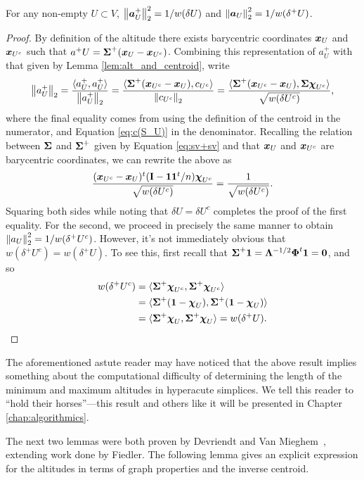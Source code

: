 \begin{lemma}
\label{lem:||alt||}
For any non-empty $U\subset V$, $\norm{\vb*{a}^+_U}_2^2=1/w(\delta U)$ and $\norm{\vb*{a}_U}_2^2 = 1/w(\delta^+ U)$.  
\end{lemma}
\begin{proof}
By definition of the altitude there exists barycentric coordinates $\vb*{x}_U$ and $\vb*{x}_{U^c}$ such that $a^+U = \boldsymbol{\Sigma}^+(\vb*{x}_U-\vb*{x}_{U^c})$. Combining this representation of $a^+_U$ with that given by Lemma \ref{lem:alt_and_centroid}, write 
\begin{align*}
    \norm{a^+_U}_2 = \frac{\langle a^+_U,a^+_U\rangle }{\norm{a^+_U}_2} = \frac{\langle \boldsymbol{\Sigma}^+(\vb*{x}_{U^c}-\vb*{x}_{U}), c_{U^c}\rangle }{\norm{c_{U^c}}_2} = \frac{\langle \boldsymbol{\Sigma}^+(\vb*{x}_{U^c}-\vb*{x}_{U}), \boldsymbol{\Sigma}\boldsymbol{\chi}_{U^c}\rangle }{\sqrt{w(\delta U^c)}},
\end{align*}
where the final equality comes from using the definition of the centroid in the numerator, and Equation \ref{eq:c(S_U)} in the denominator. Recalling the relation between $\boldsymbol{\Sigma}$ and $\boldsymbol{\Sigma}^+$ given by Equation \ref{eq:sv+sv} and that $\vb*{x}_U$ and $\vb*{x}_{U^c}$ are barycentric coordinates, we can rewrite the above as 
\[\frac{(\vb*{x}_{U^c}-\vb*{x}_{U})^t(\vb{I}-\vb{1}\vb{1}^t/n)\boldsymbol{\chi}_{U^c}}{\sqrt{w(\delta U^c)}}=\frac{1}{\sqrt{w(\delta U^c)}}. \]
Squaring both sides while noting that $\delta U = \delta U^c$ completes the proof of the first equality. For the second, we proceed in precisely the same manner to obtain $\norm{a_U}_2^2 = 1/w(\delta^+ U^c)$. However, it's not immediately obvious that $w(\delta^+U^c)=w(\delta^+U)$. To see this, first recall that $\boldsymbol{\Sigma}^+\vb{1} = \vb{\Lambda}^{-1/2}\boldsymbol{\Phi}^t\vb{1} = \vb{0}$, and so 
\begin{align*}
w(\delta^+ U^c) &= \langle \boldsymbol{\Sigma}^+\boldsymbol{\chi}_{U^c},\boldsymbol{\Sigma}^+\boldsymbol{\chi}_{U^c}\rangle  \\
&= \langle \boldsymbol{\Sigma}^+(\vb{1} - \boldsymbol{\chi}_{U}),\boldsymbol{\Sigma}^+(\vb{1} - \boldsymbol{\chi}_{U})\rangle  \\
&= \langle \boldsymbol{\Sigma}^+\boldsymbol{\chi}_{U},\boldsymbol{\Sigma}^+\boldsymbol{\chi}_{U}\rangle = w(\delta^+ U).
\qedhere
\end{align*}
\end{proof}

The aforementioned astute reader may have noticed that the above result implies something about the computational difficulty of determining the length of the minimum and maximum altitudes in hyperacute simplices. We tell this reader to ``hold their horses''---this result and others like it will be presented in Chapter \ref{chap:algorithmics}. 

The next two lemmas were both proven by Devriendt and Van Mieghem~\cite{devriendt2018simplex}, extending work done by Fiedler. 
The following lemma gives an explicit expression for the altitudes in terms of graph properties and the inverse centroid. 

